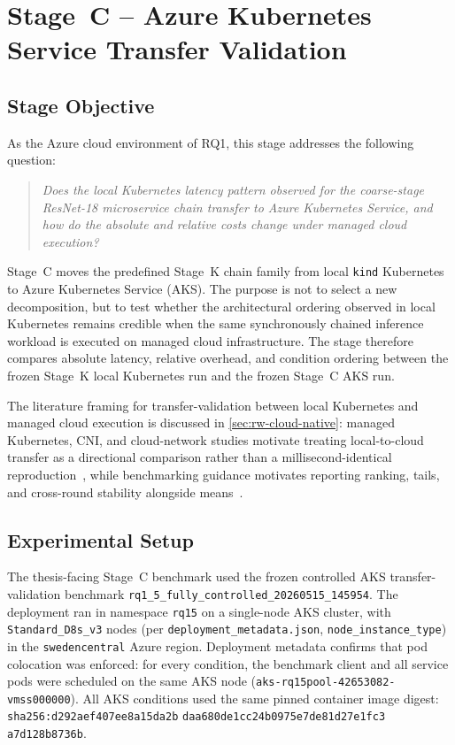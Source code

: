 \section{Stage~C -- Azure Kubernetes Service Transfer Validation}
\label{sec:rq15}

\subsection{Stage Objective}

As the Azure cloud environment of RQ1, this stage addresses the following question:

\begin{quote}
\textit{Does the local Kubernetes latency pattern observed for the coarse-stage
ResNet-18 microservice chain transfer to Azure Kubernetes Service, and how do the
absolute and relative costs change under managed cloud execution?}
\end{quote}

Stage~C moves the predefined Stage~K chain family from local \texttt{kind} Kubernetes to
Azure Kubernetes Service (AKS). The purpose is not to select a new decomposition, but to
test whether the architectural ordering observed in local Kubernetes remains credible
when the same synchronously chained inference workload is executed on managed cloud
infrastructure. The stage therefore compares absolute latency, relative overhead, and
condition ordering between the frozen Stage~K local Kubernetes run and the frozen Stage~C
AKS run.

The literature framing for transfer-validation between local Kubernetes and
managed cloud execution is discussed in \cref{sec:rw-cloud-native}: managed
Kubernetes, CNI, and cloud-network studies motivate treating local-to-cloud
transfer as a directional comparison rather than a millisecond-identical
reproduction~\cite{managed_k8s_perf,cni_k8s_ic2e21,noise_in_clouds}, while
benchmarking guidance motivates reporting ranking, tails, and cross-round
stability alongside means~\cite{benchmarking_sc15}.


\subsection{Experimental Setup}

The thesis-facing Stage~C benchmark used the frozen controlled AKS
transfer-validation benchmark \texttt{rq1\_5\_fully\_controlled\_20260515\_145954}.
The deployment ran in namespace \texttt{rq15} on a single-node AKS cluster,
with \texttt{Standard\_D8s\_v3} nodes (per
\texttt{deployment\_metadata.json}, \texttt{node\_instance\_type}) in the
\texttt{swedencentral} Azure region. Deployment metadata confirms that pod
colocation was enforced: for every condition, the benchmark client and all
service pods were scheduled on the same AKS node
(\texttt{aks-rq15pool-42653082-vmss000000}). All AKS conditions used the same
pinned container image digest:
\texttt{sha256:d292aef407ee8a15da2b}\allowbreak
\texttt{daa680de1cc24b0975e7de81d27e1fc3}\allowbreak
\texttt{a7d128b8736b}.

